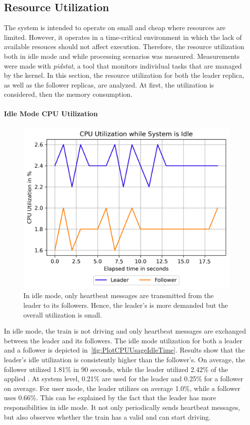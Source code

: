 \subsection{Resource Utilization}

The system is intended to operate on small and cheap  where resources are limited.
However, it operates in a time-critical environment in which the lack of available resouces should not affect execution.
Therefore, the resource utilization both in idle mode and while processing scenarios was measured.
Measurements were made with \textit{pidstat}, a tool that monitors individual tasks that are managed by the  kernel.
In this section, the resource utilization for both the leader replica, as well as the follower replicas, are analyzed.
At first, the  utilization is considered, then the memory consumption.

\paragraph{Idle Mode CPU Utilization}

\begin{figure}[!hb]
	\centering
	\includegraphics[width=0.8\linewidth]{images/plots/CPUUsageIdleTime}
	\caption{In idle mode, only heartbeat messages are transmitted from the leader to its followers. Hence, the leader's  is more demanded but the overall utilization is small.}
	\label{fig:PlotCPUUsageIdleTime}
\end{figure}


In idle mode, the train is not driving and only heartbeat messages are exchanged between the leader and its followers.
The idle mode  utilization for both a leader and a follower is depicted in~\autoref{fig:PlotCPUUsageIdleTime}.
Results show that the leader's idle  utilization is consistently higher than the follower's.
On average, the follower utilized 1.81\% in 90 seconds, while the leader utilized 2.42\% of the applied .
At system level, 0.21\% are used for the leader and 0.25\% for a follower on average.
For user mode, the leader utilizes on average 1.0\%, while a follower uses 0.66\%.
This can be explained by the fact that the leader has more responsibilities in idle mode.
It not only periodically sends heartbeat messages, but also observes whether the train has a valid  and can start driving.



